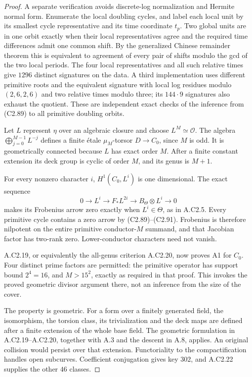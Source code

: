 \begin{proof}
A separate verification avoids discrete-log
normalization and Hermite normal form.
Enumerate the local doubling cycles, and
label each local unit by its smallest cycle
representative and its time coordinate $t_p$.
Two global units are in one orbit exactly
when their local representatives agree and
the required time differences admit one
common shift. By the generalized Chinese
remainder theorem this is equivalent to
agreement of every pair of shifts modulo
the gcd of the two local periods. The four
local representatives and all such relative
times give $1296$ distinct signatures on
the data. A third implementation uses
different primitive roots and the equivalent
signature with local log residues modulo
$(2,6,2,6)$ and two relative times modulo
three; its $144\cdot9$ signatures also exhaust
the quotient. These are independent exact
checks of the inference from (C2.89) to
all primitive doubling orbits.

Let $L$ represent $\eta$ over an algebraic
closure and choose $L^M\simeq\mathcal O$.
The algebra $\bigoplus_{j=0}^{M-1}L^{-j}$
defines a finite \'etale $\mu_M$-torsor
$D\to C_0$, since $M$ is odd. It is
geometrically connected because $L$ has
exact order $M$. After a finite constant
extension its deck group is cyclic of
order $M$, and its genus is $M+1$.

For every nonzero character $i$,
$H^1(C_0,L^i)$ is one dimensional. The
exact sequence
\[
 0\longrightarrow L^i\longrightarrow F_*L^{2i}
 \longrightarrow B_\Theta\otimes L^i\longrightarrow0
\]
makes its Frobenius arrow zero exactly
when $L^i\in\Theta$, as in A.C2.5.
Every primitive cycle contains a zero arrow
by (C2.89)--(C2.91). Frobenius is therefore
nilpotent on the entire primitive
conductor-$M$ summand, and that Jacobian
factor has two-rank zero. Lower-conductor
characters need not vanish.

A.C2.19, or equivalently the all-genus
criterion A.C2.20, now proves A1 for $C_0$.
Four distinct prime factors are permitted:
the primitive operator has support bound
$2^4=16$, and $M>15^2$, exactly as required
in that proof. This invokes the proved
geometric divisor argument there, not an
inference from the size of the cover.

The property is geometric. For a form over
a finitely generated field, the isomorphism,
the torsion class, its trivialization and
the deck maps are defined after a finite
extension of the whole base field. The
geometric formulation in A.C2.19--A.C2.20,
together with A.3 and the descent in A.8,
applies. An original collision would persist
over that extension. Functoriality to the
compactification handles open subcurves.
Coefficient conjugation gives key $302$,
and A.C2.22 supplies the other $46$ classes.


\end{proof}
